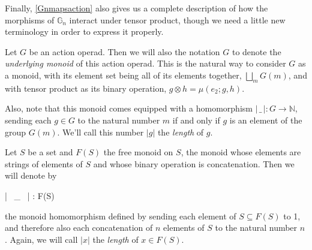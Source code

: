Finally, \cref{Gnmapsaction} also gives us a complete description of how the morphisms of $\mathbb{G}_n$ interact under tensor product, though we need a little new terminology in order to express it properly.

\begin{defn} Let $G$ be an action operad. Then we will also the notation $G$ to denote the \emph{underlying monoid} of this action operad. This is the natural way to consider $G$ as a monoid, with its element set being all of its elements together, $\bigsqcup_m G(m)$, and with tensor product as its binary operation, $g \otimes h = \mu(e_2; g, h)$.

Also, note that this monoid comes equipped with a homomorphism $| \, \_ \, | : G \to \mathbb{N}$, sending each $g \in G$ to the natural number $m$ if and only if $g$ is an element of the group $G(m)$. We'll call this number $|g|$ the \emph{length} of $g$.
\end{defn}

\begin{defn}\label{lengthdef} Let $S$ be a set and $F(S)$ the free monoid on $S$, the monoid whose elements are strings of elements of $S$ and whose binary operation is concatenation. Then we will denote by
\begin{eq*} | \, \_ \, | : F(S) \to {} \end{eq*}
the monoid homomorphism defined by sending each element of $S \subseteq F(S)$ to 1, and therefore also each concatenation of $n$ elements of $S$ to the natural number $n$. Again, we will call $|x|$ the \emph{length} of $x \in F(S)$.
\end{defn}

